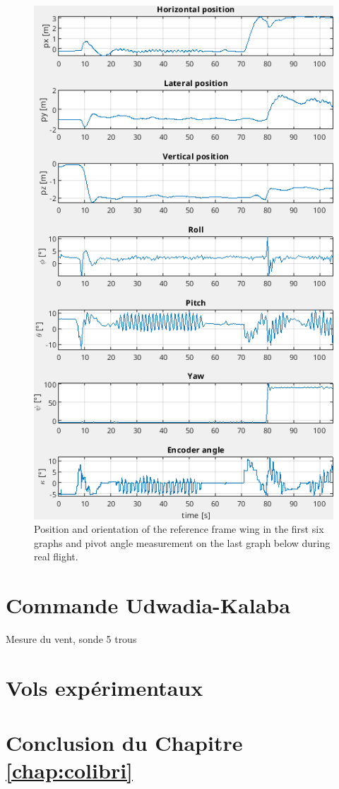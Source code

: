 \begin{figure}[h]
\centering
    \includegraphics[width=1\columnwidth,angle=0]{figures/colibri_flight.png}
    \caption{Position and orientation of the reference frame wing in the first six graphs and pivot angle measurement on the last graph below during real flight. }
    \label{fig:colibri_flight}
\end{figure}

\section{Commande Udwadia-Kalaba}

Mesure du vent, sonde 5 trous

\section{Vols expérimentaux}

\section{Conclusion du Chapitre \ref{chap:colibri}}






